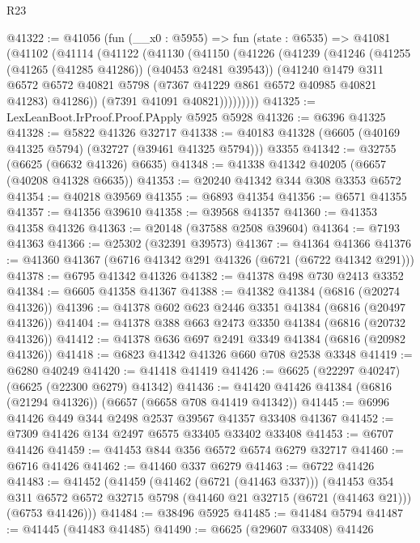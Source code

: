 \begin{lexlean}{R23}
\begin{coremodule}
@41322 := @41056
    (fun (__x0 : @5955) =>
    fun (state : @6535) =>
    @41081
      (@41102
        (@41114
          (@41122
            (@41130
              (@41150
                (@41226
                  (@41239
                    (@41246
                      (@41255 (@41265 (@41285 @41286)) (@40453 @2481 @39543))
                      (@41240
                        @1479
                        @311
                        @6572
                        @6572
                        @40821
                        @5798
                        (@7367 @41229 @861 @6572 @40985 @40821 @41283)
                        @41286))
                    (@7391 @41091 @40821)))))))))
@41325 := LexLeanBoot.IrProof.Proof.PApply @5925 @5928
@41326 := @6396 @41325
@41328 := @5822 @41326 @32717
@41338 := @40183 @41328 (@6605 (@40169 @41325 @5794) (@32727 (@39461 @41325 @5794))) @3355
@41342 := @32755 (@6625 (@6632 @41326) @6635)
@41348 := @41338 @41342 @40205 (@6657 (@40208 @41328 @6635))
@41353 := @20240 @41342 @344 @308 @3353 @6572
@41354 := @40218 @39569
@41355 := @6893 @41354
@41356 := @6571 @41355
@41357 := @41356 @39610
@41358 := @39568 @41357
@41360 := @41353 @41358 @41326
@41363 := @20148 (@37588 @2508 @39604)
@41364 := @7193 @41363
@41366 := @25302 (@32391 @39573)
@41367 := @41364 @41366
@41376 := @41360 @41367 (@6716 @41342 @291 @41326 (@6721 (@6722 @41342 @291)))
@41378 := @6795 @41342 @41326
@41382 := @41378 @498 @730 @2413 @3352
@41384 := @6605 @41358 @41367
@41388 := @41382 @41384 (@6816 (@20274 @41326))
@41396 := @41378 @602 @623 @2446 @3351 @41384 (@6816 (@20497 @41326))
@41404 := @41378 @388 @663 @2473 @3350 @41384 (@6816 (@20732 @41326))
@41412 := @41378 @636 @697 @2491 @3349 @41384 (@6816 (@20982 @41326))
@41418 := @6823 @41342 @41326 @660 @708 @2538 @3348
@41419 := @6280 @40249
@41420 := @41418 @41419
@41426 := @6625 (@22297 @40247) (@6625 (@22300 @6279) @41342)
@41436 := @41420 @41426 @41384 (@6816 (@21294 @41326)) (@6657 (@6658 @708 @41419 @41342))
@41445 := @6996 @41426 @449 @344 @2498 @2537 @39567 @41357 @33408 @41367
@41452 := @7309 @41426 @134 @2497 @6575 @33405 @33402 @33408
@41453 := @6707 @41426
@41459 := @41453 @844 @356 @6572 @6574 @6279 @32717
@41460 := @6716 @41426
@41462 := @41460 @337 @6279
@41463 := @6722 @41426
@41483 := @41452
    (@41459
      (@41462 (@6721 (@41463 @337)))
      (@41453
        @354
        @311
        @6572
        @6572
        @32715
        @5798
        (@41460 @21 @32715 (@6721 (@41463 @21)))
        (@6753 @41426)))
@41484 := @38496 @5925
@41485 := @41484 @5794
@41487 := @41445 (@41483 @41485)
@41490 := @6625 (@29607 @33408) @41426

\end{coremodule}
\end{lexlean}
